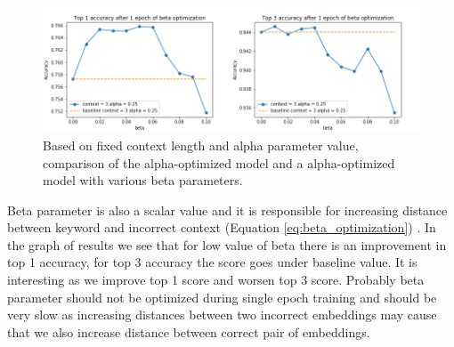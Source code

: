 \documentclass{llncs}
\begin{document}
\begin{figure}
    \label{fig:exp3}
    \caption{Based on fixed context length and alpha parameter value, comparison of the alpha-optimized model and a alpha-optimized model with various beta parameters. }
    \includegraphics[scale=0.5]{res/exp3_beta_top_acc.png}
\end{figure}
Beta parameter is also a scalar value and it is responsible for increasing distance between keyword and incorrect context (Equation \ref{eq:beta_optimization}) . In the graph of results we see that for low value of beta there is an improvement in top 1 accuracy, for top 3 accuracy the score goes under baseline value. It is interesting as we improve top 1 score and worsen top 3 score. Probably beta parameter should not be optimized during single epoch training and should be very slow as increasing distances between two incorrect embeddings may cause that we also increase distance between correct pair of embeddings.
\end{document}
